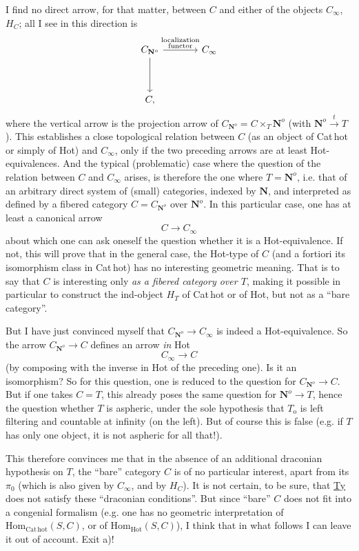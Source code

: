 \documentclass[11pt]{article}
\newcommand{\printedpage}[1]{\marginpar{\footnotesize p.~#1}}
\newcommand{\msp}[1]{\marginpar{\footnotesize [#1]}}
\newcommand{\CNo}{C_{\mathbf{N}^{o}}}
\begin{document}
\printedpage{69}

\msp{page 108}
I find no direct arrow, for that matter, between $C$ and either of the objects $C_{\infty}$, $H_{C}$; all I see in this direction is
\[
\begin{tikzcd}[column sep=large, row sep=huge]
\CNo \arrow[r, "{\substack{\text{localization}\\ \text{functor}}}"] \arrow[d] & C_{\infty} \\
C, &
\end{tikzcd}
\]
where the vertical arrow is the projection arrow of $\CNo = C \times_{T} \mathbf{N}^{o}$ (with $\mathbf{N}^{o} \xrightarrow{\ t\ } T$). This establishes a close topological relation between $C$ (as an object of Cat\,hot or simply of Hot) and $C_{\infty}$, only if the two preceding arrows are at least Hot-equivalences. And the typical (problematic) case where the question of the relation between $C$ and $C_{\infty}$ arises, is therefore the one where $T = \mathbf{N}^{o}$, i.e. that of an arbitrary direct system of (small) categories, indexed by $\mathbf{N}$, and interpreted as defined by a fibered category $C = \CNo$ over $\mathbf{N}^{o}$. In this particular case, one has at least a canonical arrow
\[
C \longrightarrow C_{\infty}
\]
about which one can ask oneself the question whether it is
\msp{page 109}
a Hot-equivalence. If not, this will prove that in the general case, the Hot-type of $C$ (and a fortiori its isomorphism class in Cat\,hot) has no interesting geometric meaning. That is to say that $C$ is interesting only \textit{as a fibered category over $T$}, making it possible in particular to construct the ind-object $H_{T}$ of Cat\,hot or of Hot, but not as a ``bare category''.

But I have just convinced myself that $\CNo \longrightarrow C_{\infty}$ is indeed a Hot-equivalence. So the arrow $\CNo \longrightarrow C$ defines an arrow \textit{in} Hot
\[
C_{\infty} \longrightarrow C
\]
(by composing with the inverse in Hot of the preceding one). Is it an isomorphism? So for this question, one is reduced to the question for $\CNo \longrightarrow C$. But if one takes $C = T$, this already poses the same question for $\mathbf{N}^{o} \longrightarrow T$, hence the question whether $T$ is aspheric, under the sole hypothesis that $T_{\mathrm{o}}$ is left filtering and countable at infinity (on the left). But of course this is false (e.g. if $T$ has only one object, it is not aspheric for all that!).

This therefore convinces me that in the absence
\printedpage{70}
\msp{page 110}
of an additional draconian hypothesis on $T$, the ``bare'' category $C$ is of no particular interest, apart from its $\pi_{0}$ (which is also given by $C_{\infty}$, and by $H_{C}$). It is not certain, to be sure, that \underline{Ty} does not satisfy these ``draconian conditions''. But since ``bare'' $C$ does not fit into a congenial formalism (e.g. one has no geometric interpretation of $\mathrm{Hom}_{\mathrm{Cat\,hot}}(S,C)$, or of $\mathrm{Hom}_{\mathrm{Hot}}(S,C)$), I think that in what follows I can leave it out of account. Exit a)!
\end{document}
